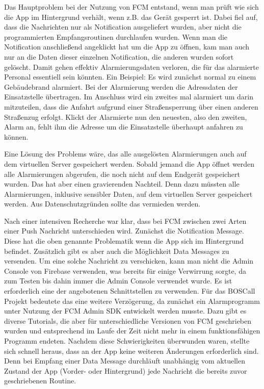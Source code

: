 Das Hauptproblem bei der Nutzung von FCM entstand, wenn man prüft wie sich die App im Hintergrund verhält, wenn z.B. das Gerät gesperrt ist. Dabei fiel auf, dass die Nachrichten nur als Notification ausgeliefert wurden, aber nicht die programmierten Empfangsroutinen durchlaufen wurden. Wenn man die Notification anschließend angeklickt hat um die App zu öffnen, kam man auch nur an die Daten dieser einzelnen Notification, die anderen wurden sofort gelöscht. Damit gehen effektiv Alarmierungsdaten verloren, die für das alarmierte Personal essentiell sein könnten. Ein Beispiel: Es wird zunächst normal zu einem Gebäudebrand alarmiert. Bei der Alarmierung werden die Adressdaten der Einsatzstelle übertragen. Im Anschluss wird ein zweites mal alarmiert um darin mitzuteilen, dass die Anfahrt aufgrund einer Straßensperrung über einen anderen Straßenzug erfolgt. Klickt der Alarmierte nun den neuesten, also den zweiten, Alarm an, fehlt ihm die Adresse um die Einsatzstelle überhaupt anfahren zu können.

Eine Lösung des Problems wäre, das alle ausgelösten Alarmierungen auch auf dem virtuellen Server gespeichert werden. Sobald jemand die App öffnet werden alle Alarmierungen abgerufen, die noch nicht auf dem Endgerät gespeichert wurden. Das hat aber einen gravierenden Nachteil. Denn dazu müssten alle Alarmierungen, inklusive sensibler Daten, auf dem virtuellen Server gespeichert werden. Aus Datenschutzgründen sollte das vermieden werden.

Nach einer intensiven Recherche war klar, dass bei FCM zwischen zwei Arten einer Push Nachricht unterschieden wird. Zunächst die Notification Message. Diese hat die oben genannte Problematik wenn die App sich im Hintergrund befindet. Zusätzlich gibt es aber auch die Möglichkeit Data Messages zu versenden. Um eine solche Nachricht zu verschicken, kann man nicht die Admin Console von Firebase verwenden, was bereits für einige Verwirrung sorgte, da zum Testen bis dahin immer die Admin Console verwendet wurde. Es ist erforderlich eine der angebotenen Schnittstellen zu verwenden. Für das BOSCall Projekt bedeutete das eine weitere Verzögerung, da zunächst ein Alarmprogramm unter Nutzung der FCM Admin SDK entwickelt werden musste. Dazu gibt es diverse Tutorials, die aber für unterschiedliche Versionen von FCM geschrieben wurden und entsprechend im Laufe der Zeit nicht mehr in einem funktionsfähigen Programm endeten. Nachdem diese Schwierigkeiten überwunden waren, stellte sich schnell heraus, dass an der App keine weiteren Änderungen erforderlich sind. Denn bei Empfang einer Data Message durchläuft unabhängig vom aktuellen Zustand der App (Vorder- oder Hintergrund) jede Nachricht die bereits zuvor geschriebenen Routine.